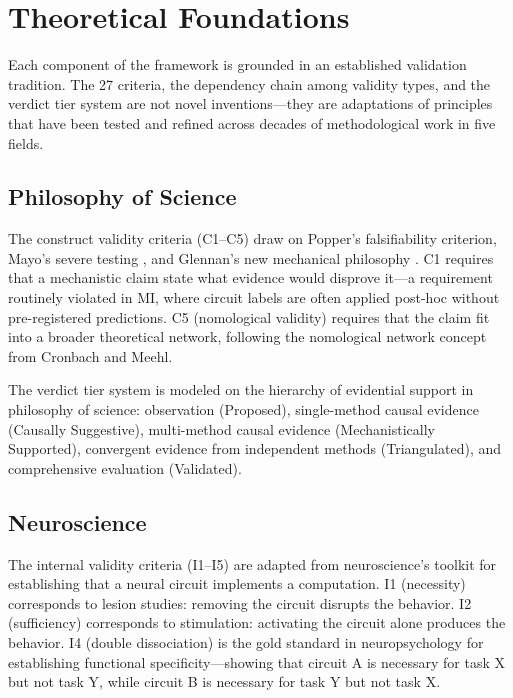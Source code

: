 \documentclass[10pt]{article}
\begin{document}
\section{Theoretical Foundations}
\label{sec:foundations}

Each component of the framework is grounded in an established validation tradition. The 27 criteria, the dependency chain among validity types, and the verdict tier system are not novel inventions---they are adaptations of principles that have been tested and refined across decades of methodological work in five fields.

\subsection{Philosophy of Science}
\label{sec:phil-sci}

The construct validity criteria (C1--C5) draw on Popper's falsifiability criterion, Mayo's severe testing \citep{mayo2018statistical}, and Glennan's new mechanical philosophy \citep{glennan2017new}. C1 requires that a mechanistic claim state what evidence would disprove it---a requirement routinely violated in MI, where circuit labels are often applied post-hoc without pre-registered predictions. C5 (nomological validity) requires that the claim fit into a broader theoretical network, following the nomological network concept from Cronbach and Meehl.

The verdict tier system is modeled on the hierarchy of evidential support in philosophy of science: observation (Proposed), single-method causal evidence (Causally Suggestive), multi-method causal evidence (Mechanistically Supported), convergent evidence from independent methods (Triangulated), and comprehensive evaluation (Validated).

\subsection{Neuroscience}
\label{sec:neuro}

The internal validity criteria (I1--I5) are adapted from neuroscience's toolkit for establishing that a neural circuit implements a computation. I1 (necessity) corresponds to lesion studies: removing the circuit disrupts the behavior. I2 (sufficiency) corresponds to stimulation: activating the circuit alone produces the behavior. I4 (double dissociation) is the gold standard in neuropsychology for establishing functional specificity---showing that circuit A is necessary for task X but not task Y, while circuit B is necessary for task Y but not task X.
\end{document}
